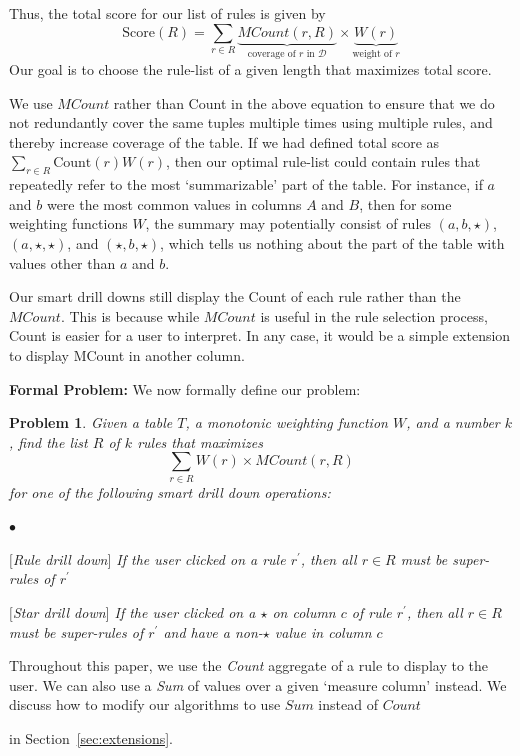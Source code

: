 \documentclass[10pt,journal,compsoc]{IEEEtran}
\newcounter{prob}
\newtheorem{problem}[prob]{Problem}
\newcommand{\stitle}[1]{\vspace{0.5em}\noindent\textbf{#1}}
\newcommand{\papertext}[1]{}
\newcommand{\techreporttext}[1]{#1}
\newcommand{\calD}{\mathcal{D}\xspace}
\newenvironment{denselist}{
    \begin{list}{\small{$\bullet$}}%
    {\setlength{\itemsep}{0ex} \setlength{\topsep}{0ex}
    \setlength{\parsep}{0pt} \setlength{\itemindent}{0pt}
    \setlength{\leftmargin}{1.5em}
    \setlength{\partopsep}{0pt}}}%
    {\end{list}}
\begin{document}
Thus, the total score for our list of rules is given by 
$$\text{Score}(R) = \sum_{r \in R} \underbrace{MCount(r, R)}_{\text{coverage of $r$ in $\calD$}} \times \underbrace{W(r)}_{\text{weight of $r$}}$$ 
Our goal is to choose the rule-list of a given length that maximizes 
total score. 


We use $MCount$ rather than Count in the above equation to ensure that we do not redundantly cover
the same tuples multiple times using multiple rules, and thereby increase coverage of the table. 
If we had defined total score as $\sum_{r \in R} \text{Count}(r)W(r)$, then our optimal rule-list could 
contain rules that repeatedly refer to the most `summarizable' part of the table. 
For instance, if $a$ and $b$ were the most common values in columns $A$ and $B$, then 
for some weighting functions $W$, 
the summary may potentially consist of rules $(a, b, \star)$, $(a, \star, \star)$, and $(\star, b, \star)$, which tells us nothing about the part of the table with values other than $a$ and $b$. 

Our smart drill downs still display the Count of each rule rather than the $MCount$. This is because while $MCount$ is useful in the rule selection process, Count is easier for a user to interpret. In any case, it would be a simple extension to display MCount in another column.

\stitle{Formal Problem:} We now formally define our problem:
\begin{problem}\label{prob:optimal-subrule-list}
Given a table $T$, a monotonic weighting function $W$, and a number $k$, find the list $R$ of $k$ rules that maximizes 
$$\sum_{r \in R} W(r) \times MCount(r,R)$$
for one of the following smart drill down operations:
\begin{denselist}
\item $[$Rule drill down$]$ If the user clicked on a rule $r^{\prime}$, then all $r \in R$ must be super-rules of $r^{\prime}$
\item $[$Star drill down$]$ If the user clicked on a $\star$ on column $c$ of rule $r^{\prime}$, then all $r \in R$ must be super-rules of $r^{\prime}$ and have a non-$\star$ value in column $c$
\end{denselist}
\end{problem}
\noindent Throughout this paper, we use the {\em Count} aggregate of a rule to display to the user. We can also use a {\em Sum} of values over a given `measure column' instead. We discuss how to modify our algorithms to use $Sum$ instead of $Count$ 
\papertext{in our technical report~\cite{tr}.}
\techreporttext{in Section~\ref{sec:extensions}.}
\end{document}

